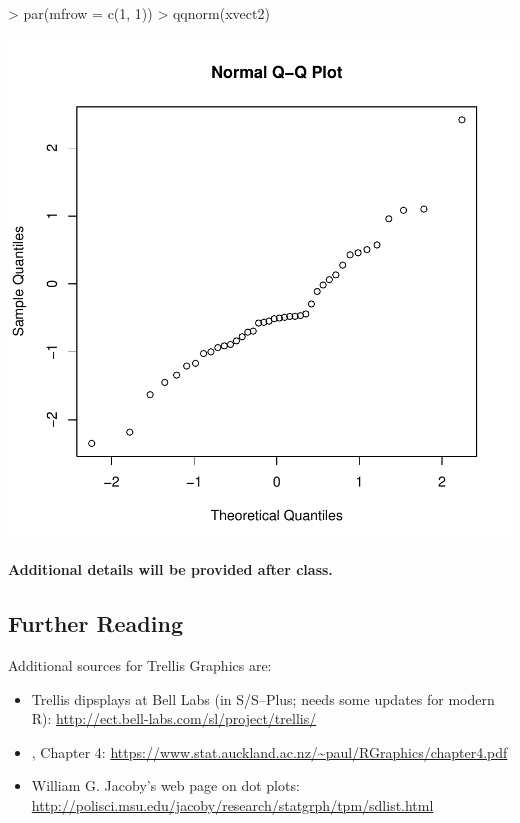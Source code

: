 \documentclass[12pt,letterpaper,final]{article}
\begin{document}
\begin{Schunk}
\begin{Sinput}
> par(mfrow = c(1, 1))
> qqnorm(xvect2)
\end{Sinput}
\end{Schunk}
\includegraphics{lect_main-041}


\else
{\bf Additional details will be provided after class.}
\fi


\newpage


\subsection{Further Reading}

Additional sources for Trellis Graphics are:

\begin{itemize}
\item Trellis dipsplays at Bell Labs (in S/S--Plus; needs some updates for modern R):
\url{http://ect.bell-labs.com/sl/project/trellis/}

\item \cite{Mu2006}, Chapter 4:
\url{https://www.stat.auckland.ac.nz/~paul/RGraphics/chapter4.pdf}

\item William G. Jacoby's web page on dot plots:
\url{http://polisci.msu.edu/jacoby/research/statgrph/tpm/sdlist.html}

\end{itemize}
\end{document}
